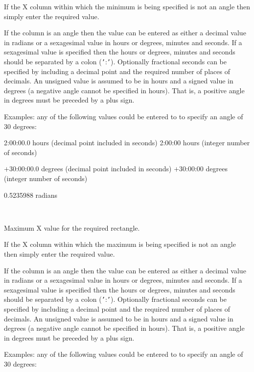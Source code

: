 \documentclass[twoside,11pt]{article}
\renewcommand{\_}{\texttt{\symbol{95}}}
\newcommand{\sstsubsection}[1]{ \item[{#1}] \mbox{} \\}
\newcommand{\sstsubsection}[1]{\item[{#1}]}
\begin{document}
\begin{htmlonly}
{{{         If the X column within which the minimum is being specified is
         not an angle then simply enter the required value.

         If the column is an angle then the value can be entered as
         either a decimal value in radians or a sexagesimal value in
         hours or degrees, minutes and seconds.  If a sexagesimal value
         is specified then the hours or degrees, minutes and seconds
         should be separated by a colon ({\tt '}:{\tt '}).  Optionally fractional
         seconds can be specified by including a decimal point and the
         required number of places of decimals.  An unsigned value is
         assumed to be in hours and a signed value in degrees (a
         negative angle cannot be specified in hours).  That is,
         a positive angle in degrees must be preceded by a plus sign.

         Examples: any of the following values could be entered to
         to specify an angle of 30 degrees:

             2:00:00.0   hours (decimal point included in seconds)
             2:00:00     hours (integer number of seconds)

           $+$30:00:00.0   degrees (decimal point included in seconds)
           $+$30:00:00     degrees (integer number of seconds)

             0.5235988   radians
      }
      \sstsubsection{
         XMAX  =  DOUBLE (read)
      }{
         Maximum X value for the required rectangle.

         If the X column within which the maximum is being specified is
         not an angle then simply enter the required value.

         If the column is an angle then the value can be entered as
         either a decimal value in radians or a sexagesimal value in
         hours or degrees, minutes and seconds.  If a sexagesimal value
         is specified then the hours or degrees, minutes and seconds
         should be separated by a colon ({\tt '}:{\tt '}).  Optionally fractional
         seconds can be specified by including a decimal point and the
         required number of places of decimals.  An unsigned value is
         assumed to be in hours and a signed value in degrees (a
         negative angle cannot be specified in hours).  That is,
         a positive angle in degrees must be preceded by a plus sign.

         Examples: any of the following values could be entered to
         to specify an angle of 30 degrees:

}}}
\end{htmlonly}
\end{document}
